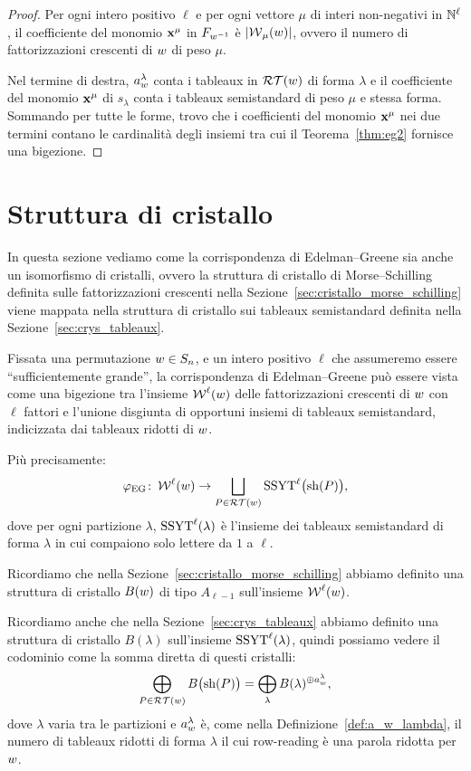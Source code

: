 \begin{proof}
    Per ogni intero positivo $\ell$ e per ogni vettore $\mu$ di interi non-negativi in
    $\mathbb{N}^\ell$, il coefficiente del monomio $\mathbf{x}^\mu$ in $F_{w^{-1}}$ \`e
    $\lvert \operatorname{\mathcal{W}}_\mu(w)\rvert$, ovvero il
    numero di fattorizzazioni crescenti di $w$ di peso $\mu$.
    
    Nel termine di destra, $a_w^\lambda$ conta i tableaux in $\operatorname{\mathcal{RT}}(w)$ di
    forma $\lambda$ e il coefficiente del monomio $\mathbf{x}^\mu$ di $s_\lambda$
    conta i tableaux semistandard di peso $\mu$ e stessa forma.
    Sommando per tutte le forme, trovo che i coefficienti del monomio
    $\mathbf{x}^\mu$ nei due termini
    contano le cardinalit\`a degli insiemi tra cui il Teorema~\ref{thm:eg2}
    fornisce una bigezione.
\end{proof}


\section{Struttura di cristallo}

In questa sezione vediamo come la corrispondenza di Edelman--Greene sia anche
un isomorfismo di cristalli, ovvero la struttura di cristallo di
Morse--Schilling definita sulle fattorizzazioni
crescenti nella Sezione~\ref{sec:cristallo_morse_schilling} viene mappata nella struttura 
di cristallo sui tableaux semistandard definita nella Sezione~\ref{sec:crys_tableaux}.

Fissata una permutazione $w \in S_n$, e un intero positivo $\ell$ che 
assumeremo essere ``sufficientemente grande'',
la corrispondenza di Edelman--Greene pu\`o
essere vista come una bigezione tra l'insieme $\operatorname{\mathcal{W}}^\ell(w)$ delle
fattorizzazioni crescenti di $w$ con $\ell$ fattori e
l'unione disgiunta di opportuni insiemi di tableaux semistandard,
indicizzata dai tableaux ridotti  di $w$.

Pi\`u precisamente:
\[
    \varphi_{\mathrm{EG}} \colon 
    \operatorname{\mathcal{W}}^\ell(w) \to
    \bigsqcup_{P \in \operatorname{\mathcal{RT}}(w)}
    \operatorname{SSYT}^\ell\bigl(\operatorname{sh}(P)\bigr),
\]
dove per ogni partizione $\lambda$,
$\operatorname{SSYT}^\ell(\lambda)$ \`e l'insieme dei tableaux semistandard di forma $\lambda$ in 
cui compaiono solo lettere da $1$ a $\ell$.

Ricordiamo che nella Sezione~\ref{sec:cristallo_morse_schilling}
abbiamo definito una struttura di cristallo $B(w)$ di tipo $A_{\ell-1}$ sull'insieme 
$\operatorname{\mathcal{W}}^\ell(w)$.

Ricordiamo anche che nella Sezione~\ref{sec:crys_tableaux} abbiamo definito
una struttura di cristallo $B(\lambda)$ sull'insieme $\operatorname{SSYT}^\ell(\lambda)$,
quindi possiamo vedere il codominio come la somma diretta di questi cristalli:
\[
    \bigoplus_{P \in \operatorname{\mathcal{RT}}(w)} B\bigl(\operatorname{sh}(P)\bigr)
    =
    \bigoplus_\lambda B(\lambda)^{\oplus a_w^\lambda},
\]
dove $\lambda$ varia tra le partizioni e $a_w^\lambda$ \`e,
come nella Definizione~\ref{def:a_w_lambda}, il numero di 
tableaux ridotti di forma $\lambda$ il cui row-reading \`e una parola ridotta per $w$.

